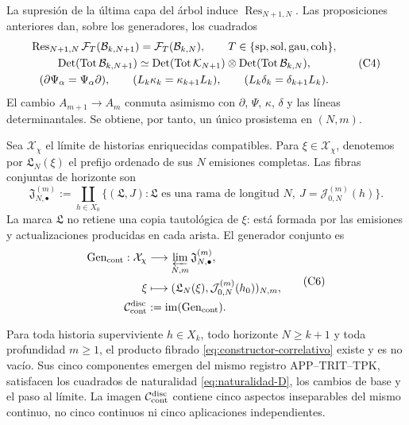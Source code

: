 La supresión de la última capa del árbol induce
\(\operatorname{Res}_{N+1,N}\). Las proposiciones anteriores dan, sobre los
generadores, los cuadrados
\[
\begin{gathered}
 \operatorname{Res}_{N+1,N}\mathcal F_T(\mathcal B_{k,N+1})
 =\mathcal F_T(\mathcal B_{k,N}),
 \qquad T\in\{{\rm sp},{\rm sol},{\rm gau},{\rm coh}\},\\
 \operatorname{Det}(\operatorname{Tot}\mathcal B_{k,N+1})
 \simeq
 \operatorname{Det}(\operatorname{Tot}\mathcal K_{N+1})
 \otimes
 \operatorname{Det}(\operatorname{Tot}\mathcal B_{k,N}),\\
 (\partial\Psi_\alpha=\Psi_\alpha\partial),\qquad
 (L_k\kappa_k=\kappa_{k+1}L_k),\qquad
 (L_k\delta_k=\delta_{k+1}L_k).
\end{gathered}
 \tag{C4}
 \label{eq:naturalidad-D}
\]
El cambio \(A_{m+1}\to A_m\) conmuta asimismo con \(\partial\), \(\Psi\),
\(\kappa\), \(\delta\) y las líneas determinantales. Se obtiene, por tanto,
un único prosistema en \((N,m)\).

Sea \(\mathcal X_\chi\) el límite de historias enriquecidas compatibles. Para
\(\xi\in\mathcal X_\chi\), denotemos por \(\mathfrak L_N(\xi)\) el prefijo
ordenado de sus \(N\) emisiones completas. Las fibras conjuntas de horizonte
son
\[
 \mathfrak J_{N,\bullet}^{(m)}
 :=\coprod_{h\in X_0}
 \{(\mathfrak L,J):\mathfrak L\text{ es una rama de longitud }N,
       \ J=\mathcal J_{0,N}^{(m)}(h)\}.
 \tag{C5}
 \label{eq:fibras-conjuntas-horizonte}
\]
La marca \(\mathfrak L\) no retiene una copia tautológica de \(\xi\): está
formada por las emisiones y actualizaciones producidas en cada arista. El
generador conjunto es
\[
\begin{aligned}
 \operatorname{Gen}_{\rm cont}:\mathcal X_\chi
   &\longrightarrow\varprojlim_{N,m}\mathfrak J_{N,\bullet}^{(m)},\\
 \xi&\longmapsto
   (\mathfrak L_N(\xi),\mathcal J_{0,N}^{(m)}(h_0))_{N,m},\\
 \mathcal C_{\rm cont}^{\rm disc}
   &:=\operatorname{im}(\operatorname{Gen}_{\rm cont}).
\end{aligned}
 \tag{C6}
 \label{eq:continuo-discreto}
\]

\begin{theorem}
\label{thm:correlacion-cinco}
Para toda historia superviviente \(h\in X_k\), todo horizonte
\(N\geq k+1\) y toda profundidad \(m\geq1\), el producto fibrado
\eqref{eq:constructor-correlativo} existe y es no vacío. Sus cinco
componentes emergen del mismo registro APP--TRIT--TPK, satisfacen los
cuadrados de naturalidad \eqref{eq:naturalidad-D}, los cambios de base y el
paso al límite. La imagen \(\mathcal C_{\rm cont}^{\rm disc}\) contiene cinco
aspectos inseparables del mismo continuo, no cinco continuos ni cinco
aplicaciones independientes.
\end{theorem}

